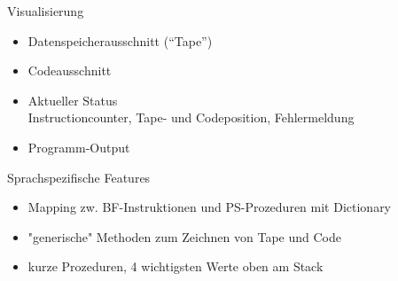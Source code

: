 \documentclass{beamer}
\begin{document}
\begin{frame}{Visualisierung}

    \begin{itemize}
        \item Datenspeicherausschnitt (``Tape'')
        \item Codeausschnitt
        \item Aktueller Status \\Instructioncounter, Tape- und Codeposition, Fehlermeldung
        \item Programm-Output
    \end{itemize}
\end{frame}

\begin{frame}{Sprachspezifische Features}
    \begin{itemize}
        \item Mapping zw. BF-Instruktionen und PS-Prozeduren mit Dictionary
        \item "generische" Methoden zum Zeichnen von Tape und Code
        \item kurze Prozeduren, 4 wichtigsten Werte oben am Stack
    \end{itemize}
\end{frame}
\end{document}
